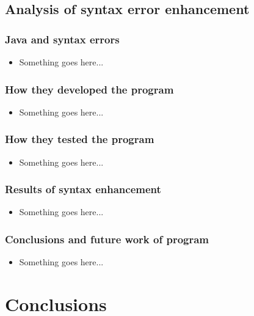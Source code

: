 \documentclass{beamer}
\begin{document}
\subsection[Syntax error enhancement]{Analysis of syntax error enhancement}

\begin{frame}
	\frametitle{Java and syntax errors}
		\begin{itemize}
			\item Something goes here...
		\end{itemize}

\end{frame}

\begin{frame}
	\frametitle{How they developed the program}
		\begin{itemize}
			\item Something goes here...
		\end{itemize}

\end{frame}

\begin{frame}
	\frametitle{How they tested the program}
		\begin{itemize}
			\item Something goes here...
		\end{itemize}

\end{frame}

\begin{frame}
	\frametitle{Results of syntax enhancement}
		\begin{itemize}
			\item Something goes here...
		\end{itemize}

\end{frame}

\begin{frame}
	\frametitle{Conclusions and future work of program}
		\begin{itemize}
			\item Something goes here...
		\end{itemize}

\end{frame}


\section[Conclusions]{Conclusions}
\end{document}
